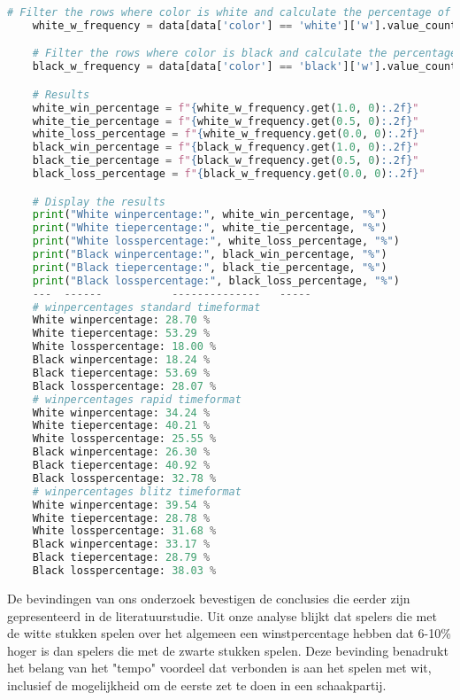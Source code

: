 \begin{lstlisting}[language=Python]
    # Filter the rows where color is white and calculate the percentage of different values of w
    white_w_frequency = data[data['color'] == 'white']['w'].value_counts(normalize=True) * 100

    # Filter the rows where color is black and calculate the percentage of different values of w
    black_w_frequency = data[data['color'] == 'black']['w'].value_counts(normalize=True) * 100

    # Results
    white_win_percentage = f"{white_w_frequency.get(1.0, 0):.2f}" 
    white_tie_percentage = f"{white_w_frequency.get(0.5, 0):.2f}"
    white_loss_percentage = f"{white_w_frequency.get(0.0, 0):.2f}"
    black_win_percentage = f"{black_w_frequency.get(1.0, 0):.2f}"
    black_tie_percentage = f"{black_w_frequency.get(0.5, 0):.2f}"
    black_loss_percentage = f"{black_w_frequency.get(0.0, 0):.2f}"

    # Display the results
    print("White winpercentage:", white_win_percentage, "%")
    print("White tiepercentage:", white_tie_percentage, "%")
    print("White losspercentage:", white_loss_percentage, "%")
    print("Black winpercentage:", black_win_percentage, "%")
    print("Black tiepercentage:", black_tie_percentage, "%")
    print("Black losspercentage:", black_loss_percentage, "%")
    ---  ------           --------------   -----  
    # winpercentages standard timeformat  
    White winpercentage: 28.70 %
    White tiepercentage: 53.29 %
    White losspercentage: 18.00 %
    Black winpercentage: 18.24 %
    Black tiepercentage: 53.69 %
    Black losspercentage: 28.07 %
    # winpercentages rapid timeformat  
    White winpercentage: 34.24 %
    White tiepercentage: 40.21 %
    White losspercentage: 25.55 %
    Black winpercentage: 26.30 %
    Black tiepercentage: 40.92 %
    Black losspercentage: 32.78 %
    # winpercentages blitz timeformat 
    White winpercentage: 39.54 %
    White tiepercentage: 28.78 %
    White losspercentage: 31.68 %
    Black winpercentage: 33.17 %
    Black tiepercentage: 28.79 %
    Black losspercentage: 38.03 % 
\end{lstlisting}

De bevindingen van ons onderzoek bevestigen de conclusies die eerder zijn gepresenteerd in de literatuurstudie. Uit onze analyse blijkt dat spelers die met de witte stukken spelen over het algemeen een winstpercentage hebben dat 6-10\% hoger is dan spelers die met de zwarte stukken spelen. Deze bevinding benadrukt het belang van het "tempo" voordeel dat verbonden is aan het spelen met wit, inclusief de mogelijkheid om de eerste zet te doen in een schaakpartij. 


